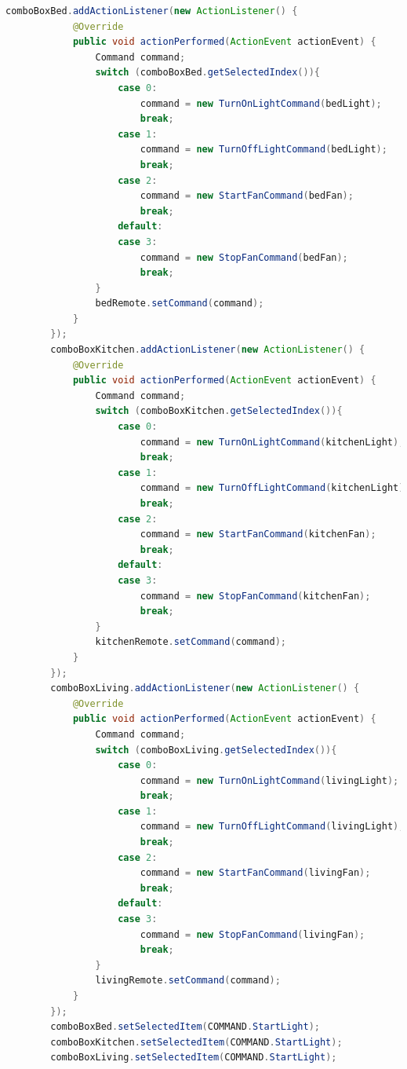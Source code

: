 \documentclass{article}
\begin{document}
\begin{lstlisting}[language=Java]
        comboBoxBed.addActionListener(new ActionListener() {
            @Override
            public void actionPerformed(ActionEvent actionEvent) {
                Command command;
                switch (comboBoxBed.getSelectedIndex()){
                    case 0:
                        command = new TurnOnLightCommand(bedLight);
                        break;
                    case 1:
                        command = new TurnOffLightCommand(bedLight);
                        break;
                    case 2:
                        command = new StartFanCommand(bedFan);
                        break;
                    default:
                    case 3:
                        command = new StopFanCommand(bedFan);
                        break;
                }
                bedRemote.setCommand(command);
            }
        });
        comboBoxKitchen.addActionListener(new ActionListener() {
            @Override
            public void actionPerformed(ActionEvent actionEvent) {
                Command command;
                switch (comboBoxKitchen.getSelectedIndex()){
                    case 0:
                        command = new TurnOnLightCommand(kitchenLight);
                        break;
                    case 1:
                        command = new TurnOffLightCommand(kitchenLight);
                        break;
                    case 2:
                        command = new StartFanCommand(kitchenFan);
                        break;
                    default:
                    case 3:
                        command = new StopFanCommand(kitchenFan);
                        break;
                }
                kitchenRemote.setCommand(command);
            }
        });
        comboBoxLiving.addActionListener(new ActionListener() {
            @Override
            public void actionPerformed(ActionEvent actionEvent) {
                Command command;
                switch (comboBoxLiving.getSelectedIndex()){
                    case 0:
                        command = new TurnOnLightCommand(livingLight);
                        break;
                    case 1:
                        command = new TurnOffLightCommand(livingLight);
                        break;
                    case 2:
                        command = new StartFanCommand(livingFan);
                        break;
                    default:
                    case 3:
                        command = new StopFanCommand(livingFan);
                        break;
                }
                livingRemote.setCommand(command);
            }
        });
        comboBoxBed.setSelectedItem(COMMAND.StartLight);
        comboBoxKitchen.setSelectedItem(COMMAND.StartLight);
        comboBoxLiving.setSelectedItem(COMMAND.StartLight);


\end{lstlisting}
\end{document}

